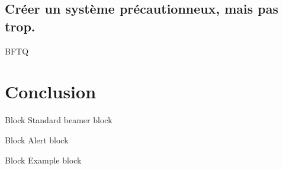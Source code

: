 \documentclass[french]{beamer}
\begin{document}
    \subsection{Créer un système précautionneux, mais pas trop.}

    \begin{frame}

        BFTQ

    \end{frame}

    \section{Conclusion}
    \begin{frame}
    \end{frame}

    \begin{frame}
        \begin{block}{Block}
            Standard beamer block
        \end{block}
        \begin{alertblock}{Block}
            Alert block
        \end{alertblock}
        \begin{exampleblock}{Block}
            Example block
        \end{exampleblock}
    \end{frame}
\end{document}
